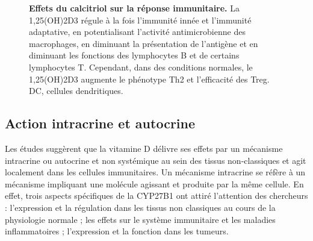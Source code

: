 \documentclass[
  a4paper,
  DIV=11,
  numbers=noendperiod,
  listof=totoc]{scrreprt}
\begin{document}
\begin{figure}


\caption[Effets du calcitriol sur la réponse
immunitaire.]{\label{fig-vd-immune-effect}\textbf{Effets du calcitriol
sur la réponse immunitaire.} La \ac{1,25(OH)2D3} régule à la fois
l'immunité innée et l'immunité adaptative, en potentialisant l'activité
antimicrobienne des macrophages, en diminuant la présentation de
l'antigène et en diminuant les fonctions des lymphocytes B et de
certains lymphocytes T. Cependant, dans des conditions normales, le
\ac{1,25(OH)2D3} augmente le phénotype \ac{Th2} et l'efficacité des
\ac{Treg}. DC, cellules dendritiques. \autocite{Cutolo.2014}}

\end{figure}%

\subsection{Action intracrine et
autocrine}\label{action-intracrine-et-autocrine}

Les études suggèrent que la vitamine D délivre ses effets par un
mécanisme intracrine ou autocrine et non systémique au sein des tissus
non-classiques \autocite{Hewison.2007} et agit localement dans les
cellules immunitaires. Un mécanisme intracrine se réfère à un mécanisme
impliquant une molécule agissant et produite par la même cellule. En
effet, trois aspects spécifiques de la \ac{CYP27B1} ont attiré
l'attention des chercheurs : l'expression et la régulation dans les
tissus non classiques au cours de la physiologie normale ; les effets
sur le système immunitaire et les maladies inflammatoires ; l'expression
et la fonction dans les tumeurs.
\end{document}
